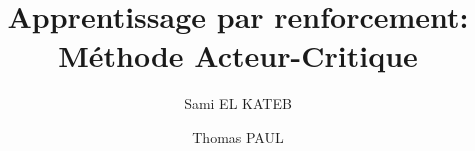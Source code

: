 
\title{Apprentissage par renforcement: \\ Méthode Acteur-Critique}
\author{Sami EL KATEB \and Thomas PAUL}
\date{}


  

